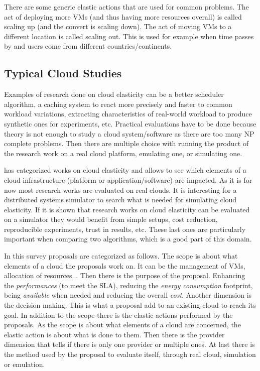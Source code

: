 \documentclass[a4paper, onecolumn, 11pt]{article}
\begin{document}
  There are some generic elastic actions that are used for common problems. The
  act of deploying more VMs (and thus having more resources overall) is called
  scaling up (and the convert is scaling down). The act of moving VMs to a
  different location is called scaling out. This is used for example when time
  passes by and users come from different countries/continents.
  
  \subsection{Typical Cloud Studies}
  Examples of research done on cloud elasticity can be a better scheduler 
  algorithm, a caching system to react more precisely and faster to common 
  workload variations, extracting characteristics of real-world workload to 
  produce synthetic ones for experiments, etc. Practical evaluations have to be 
  done because theory is not enough to study a cloud system/software as there 
  are too many NP complete problems. Then there are multiple choice with 
  running the product of the research work on a real cloud platform, emulating 
  one, or simulating one. 
  
  \cite{Naskos2016} has categorized works on cloud elasticity and allows to see
  which elements of a cloud infrastructure (platform or application/software)
  are impacted. As it is for now most research works are evaluated on real
  clouds. It is interesting for a distributed systems simulator to search what
  is needed for simulating cloud elasticity. If it is shown that research works
  on cloud elasticity can be evaluated on a simulator they would benefit from
  simple setups, cost reduction, reproducible experiments, trust in results,
  etc. These last ones are particularly important when comparing two algorithms,
  which is a good part of this domain.
  
  In this survey proposals are categorized as follows. The scope is about what
  elements of a cloud the proposals work on. It can be the management of VMs,
  allocation of resources... Then there is the purpose of the proposal.
  Enhancing the \textit{performances} (to meet the SLA), reducing the
  \textit{energy consumption} footprint, being \textit{available} when needed
  and reducing the overall \textit{cost}. Another dimension is the decision
  making. This is what a proposal add to an existing cloud to reach its goal. In
  addition to the scope there is the elastic actions performed by the proposals.
  As the scope is about what elements of a cloud are concerned, the elastic
  action is about what is done to them. Then there is the provider dimension
  that tells if there is only one provider or multiple ones. At last there is
  the method used by the proposal to evaluate itself, through real cloud,
  simulation or emulation.
  
\end{document}
